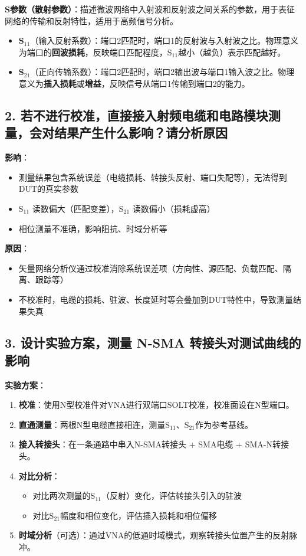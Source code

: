 \documentclass[12pt,a4paper]{article}
\begin{document}
\textbf{S参数（散射参数）}：描述微波网络中入射波和反射波之间关系的参数，用于表征网络的传输和反射特性，适用于高频信号分析。

\begin{itemize}
    \item \textbf{S\(_{11}\)}（输入反射系数）：端口2匹配时，端口1的反射波与入射波之比。物理意义为端口的\textbf{回波损耗}，反映端口匹配程度，S\(_{11}\)越小（越负）表示匹配越好。
    \item \textbf{S\(_{21}\)}（正向传输系数）：端口2匹配时，端口2输出波与端口1输入波之比。物理意义为\textbf{插入损耗}或\textbf{增益}，反映信号从端口1传输到端口2的能力。
\end{itemize}

\subsection*{2. 若不进行校准，直接接入射频电缆和电路模块测量，会对结果产生什么影响？请分析原因}

\textbf{影响}：
\begin{itemize}
    \item 测量结果包含系统误差（电缆损耗、转接头反射、端口失配等），无法得到DUT的真实参数
    \item S\(_{11}\) 读数偏大（匹配变差），S\(_{21}\) 读数偏小（损耗虚高）
    \item 相位测量不准确，影响阻抗、时域分析等
\end{itemize}

\textbf{原因}：
\begin{itemize}
    \item 矢量网络分析仪通过校准消除系统误差项（方向性、源匹配、负载匹配、隔离、跟踪等）
    \item 不校准时，电缆的损耗、驻波、长度延时等会叠加到DUT特性中，导致测量结果失真
\end{itemize}

\subsection*{3. 设计实验方案，测量 N-SMA 转接头对测试曲线的影响}

\textbf{实验方案}：
\begin{enumerate}
    \item \textbf{校准}：使用N型校准件对VNA进行双端口SOLT校准，校准面设在N型端口。
    \item \textbf{直通测量}：两根N型电缆直接相连，测量S\(_{11}\)、S\(_{21}\)作为参考基线。
    \item \textbf{接入转接头}：在一条通路中串入N-SMA转接头 + SMA电缆 + SMA-N转接头。
    \item \textbf{对比分析}：
        \begin{itemize}
            \item 对比两次测量的S\(_{11}\)（反射）变化，评估转接头引入的驻波
            \item 对比S\(_{21}\)幅度和相位变化，评估插入损耗和相位偏移
        \end{itemize}
    \item \textbf{时域分析}（可选）：通过VNA的低通时域模式，观察转接头位置产生的反射脉冲。
\end{enumerate}
\end{document}
